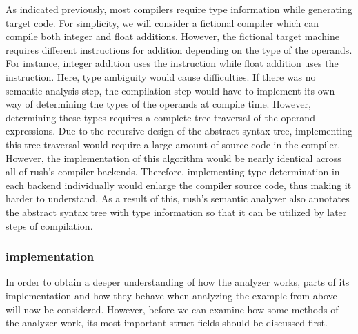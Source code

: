 As indicated previously, most compilers require type information while
generating target code. For simplicity, we will consider a fictional compiler
which can compile both integer and float additions. However, the fictional
target machine requires different instructions for addition depending on the
type of the operands. For instance, integer addition uses the  instruction
while float addition uses the  instruction. Here, type ambiguity would
cause difficulties. If there was no semantic analysis step, the compilation step would
have to implement its own way of determining the types of the operands at
compile time. However, determining these types requires a complete
tree-traversal of the operand expressions. Due to the recursive design of the
abstract syntax tree, implementing this tree-traversal would require a large amount of source code in the compiler.
However, the implementation of this algorithm would be nearly identical across all of rush's compiler
backends. Therefore, implementing type determination in each backend
individually would enlarge the compiler source code, thus making it harder to
understand. As a result of this, rush's semantic analyzer also annotates the abstract syntax tree with type
information so that it can be utilized by later steps of compilation.

\subsubsection{implementation}

In order to obtain a deeper understanding of how the analyzer works, parts of its implementation and how they behave when analyzing the
example from above will now be considered. However, before we can examine how some methods of the analyzer work,
its most important struct fields should be discussed first.


